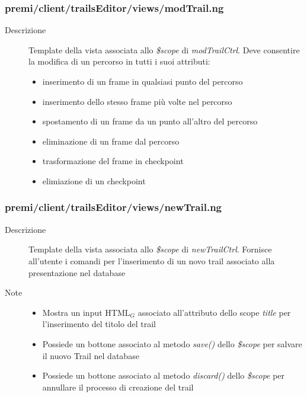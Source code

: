 \subsubsection{premi/client/trailsEditor/views/modTrail.ng}

\begin{description}
\item[Descrizione] \hfill
	Template della vista associata allo \textit{\$scope} di \textit{modTrailCtrl}. Deve consentire la modifica di un percorso in tutti i suoi attributi:
	\begin{itemize}
			\item inserimento di un frame in qualsiasi punto del percorso
			\item inserimento dello stesso frame più volte nel percorso
						\item spostamento di un frame da un punto all'altro del percorso
			\item eliminazione di un frame dal percorso
			\item trasformazione del frame in checkpoint
			\item elimiazione di un checkpoint
	\end{itemize}
\end{description}

\subsubsection{premi/client/trailsEditor/views/newTrail.ng}

\begin{description}
\item[Descrizione] \hfill
	Template della vista associata allo \textit{\$scope} di \textit{newTrailCtrl}. Fornisce all'utente i comandi per l'inserimento di un novo trail associato alla presentazione nel database
\item[Note] \hfill
	\begin{itemize}
			\item Mostra un input HTML$_G$ associato all'attributo dello scope \textit{title} per l'inserimento del titolo del trail
			\item Possiede un bottone associato al metodo \textit{save()} dello \textit{\$scope} per salvare il nuovo Trail nel database
			\item Possiede un bottone associato al metodo \textit{discard()} dello \textit{\$scope} per annullare il processo di creazione del trail
	\end{itemize}
\end{description}

